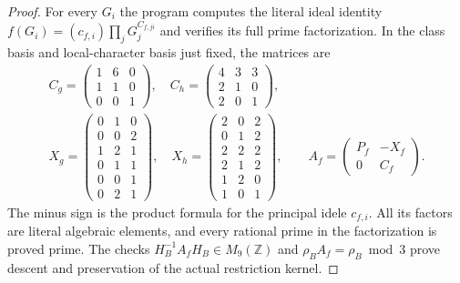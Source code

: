 \begin{proof}
For every $G_i$ the program computes the literal ideal identity
$f(G_i)=(c_{f,i})\prod_jG_j^{C_{f,ji}}$ and verifies its full
prime factorization. In the class basis and local-character
basis just fixed, the matrices are
\[
 \begin{gathered}
 C_g=\begin{pmatrix}1&6&0\\1&1&0\\0&0&1\end{pmatrix},
 \quad C_h=\begin{pmatrix}4&3&3\\2&1&0\\2&0&1\end{pmatrix},\\
 X_g=\begin{pmatrix}0&1&0\\0&0&2\\1&2&1\\0&1&1\\0&0&1\\0&2&1\end{pmatrix},
 \quad
 X_h=\begin{pmatrix}2&0&2\\0&1&2\\2&2&2\\2&1&2\\1&2&0\\1&0&1\end{pmatrix},
 \qquad A_f=\begin{pmatrix}P_f&-X_f\\0&C_f\end{pmatrix}.
 \end{gathered}
 \tag{E121.14}
\]
The minus sign is the product formula for the principal idele
$c_{f,i}$. All its factors are literal algebraic elements,
and every rational prime in the factorization is proved prime.
The checks $H_B^{-1}A_fH_B\in M_9(\mathbb Z)$ and
$\rho_BA_f=\rho_B\bmod3$ prove descent and preservation
of the actual restriction kernel.


\end{proof}
